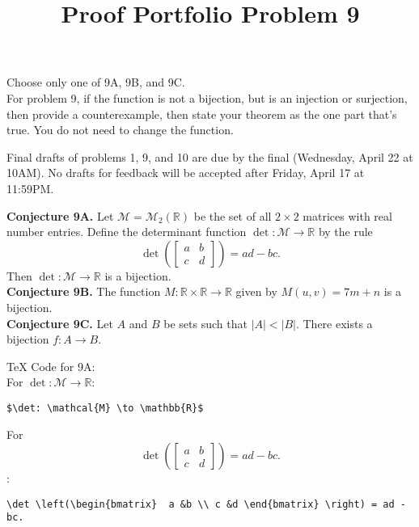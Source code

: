 \documentclass{article}  %
\title{Proof Portfolio Problem 9}
\author{}
\date{}
\begin{document}
\maketitle

Choose only one of 9A, 9B, and 9C.\\

For problem 9, if the function is not a bijection, but is an injection or surjection, then provide a counterexample, then state your theorem as the one part that's true. You do not need to change the function.



Final drafts of problems 1, 9, and 10 are due by the final (Wednesday, April 22 at 10AM).  No drafts for feedback will be accepted after Friday, April 17 at 11:59PM.


\noindent\textbf{Conjecture 9A.}  Let $\mathcal{M}=\mathcal{M}_2(\mathbb{R})$ be the set of all $2\times 2$ matrices with real number entries. Define the determinant function $\det: \mathcal{M} \to \mathbb{R}$ by the rule
	\[\det \left(\begin{bmatrix}  a &b \\ c &d \end{bmatrix} \right) = ad -bc.\]
Then $\det: \mathcal{M}\to\mathbb{R}$ is a bijection.\\
 

\noindent\textbf{Conjecture 9B.}  The function $M: \mathbb{R} \times \mathbb{R} \to \mathbb{R}$ given by $M(u,v) = 7m + n$ is a bijection.\\

\noindent\textbf{Conjecture 9C.}  Let $A$ and $B$ be sets such that $|A|<|B|$. There exists a bijection $f: A \to B$.

TeX Code for 9A: \\

For $\det: \mathcal{M} \to \mathbb{R}$:
\begin{verbatim}
$\det: \mathcal{M} \to \mathbb{R}$
\end{verbatim}

For \[\det \left(\begin{bmatrix}  a &b \\ c &d \end{bmatrix} \right) = ad -bc.\]:

\begin{verbatim}
\det \left(\begin{bmatrix}  a &b \\ c &d \end{bmatrix} \right) = ad -bc.
\end{verbatim}
\end{document}
